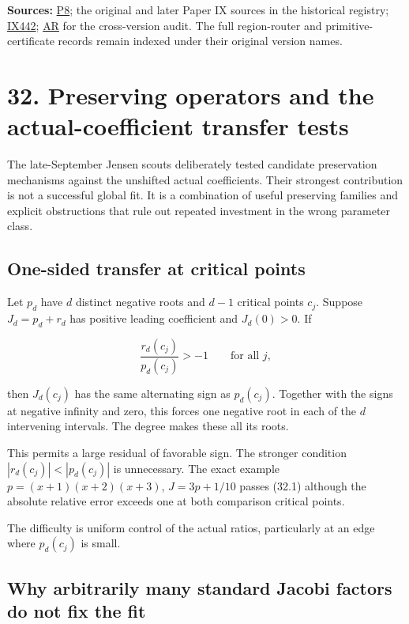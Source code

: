 \documentclass[
  10pt,
  a4paper,
  10pt,
  oneside,
  openany]{book}
\begin{document}
\textbf{Sources:} \hyperref[source-p8]{P8}; the original and later Paper
IX sources in the historical registry; \hyperref[source-ix442]{IX442};
\hyperref[source-ar]{AR} for the cross-version audit. The full
region-router and primitive-certificate records remain indexed under
their original version names.

\section{32. Preserving operators and the actual-coefficient transfer
tests}\label{ch-preservers}

The late-September Jensen scouts deliberately tested candidate
preservation mechanisms against the unshifted actual coefficients. Their
strongest contribution is not a successful global fit. It is a
combination of useful preserving families and explicit obstructions that
rule out repeated investment in the wrong parameter class.

\subsection{One-sided transfer at critical
points}\label{one-sided-transfer-at-critical-points}

Let \(p_d\) have \(d\) distinct negative roots and \(d-1\) critical
points \(c_j\). Suppose \(J_d=p_d+r_d\) has positive leading coefficient
and \(J_d(0)>0\). If

\[
 \frac{r_d(c_j)}{p_d(c_j)}>-1\qquad\text{for all }j,
 \tag{32.1}\label{eq:32.1}
\]

then \(J_d(c_j)\) has the same alternating sign as \(p_d(c_j)\).
Together with the signs at negative infinity and zero, this forces one
negative root in each of the \(d\) intervening intervals. The degree
makes these all its roots.

This permits a large residual of favorable sign. The stronger condition
\(|r_d(c_j)|<|p_d(c_j)|\) is unnecessary. The exact example
\(p=(x+1)(x+2)(x+3)\), \(J=3p+1/10\) passes (32.1) although the absolute
relative error exceeds one at both comparison critical points.

The difficulty is uniform control of the actual ratios, particularly at
an edge where \(p_d(c_j)\) is small.

\subsection{Why arbitrarily many standard Jacobi factors do not fix the
fit}\label{why-arbitrarily-many-standard-jacobi-factors-do-not-fix-the-fit}
\end{document}
